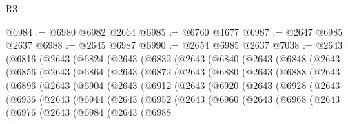 \begin{lexlean}{R3}
\begin{coremodule}
@6984 := @6980 @6982 @2664
@6985 := @6760 @1677
@6987 := @2647 @6985 @2637
@6988 := @2645 @6987
@6990 := @2654 @6985 @2637
@7038 := @2643
    (@6816
      (@2643
        (@6824
          (@2643
            (@6832
              (@2643
                (@6840
                  (@2643
                    (@6848
                      (@2643
                        (@6856
                          (@2643
                            (@6864
                              (@2643
                                (@6872
                                  (@2643
                                    (@6880
                                      (@2643
                                        (@6888
                                          (@2643
                                            (@6896
                                              (@2643
                                                (@6904
                                                  (@2643
                                                    (@6912
                                                      (@2643
                                                        (@6920
                                                          (@2643
                                                            (@6928
                                                              (@2643
                                                                (@6936
                                                                  (@2643
                                                                    (@6944
                                                                      (@2643
                                                                        (@6952
                                                                          (@2643
                                                                            (@6960
                                                                              (@2643
                                                                                (@6968
                                                                                  (@2643
                                                                                    (@6976
                                                                                      (@2643
                                                                                        (@6984
                                                                                          (@2643
                                                                                            (@6988

\end{coremodule}
\end{lexlean}

